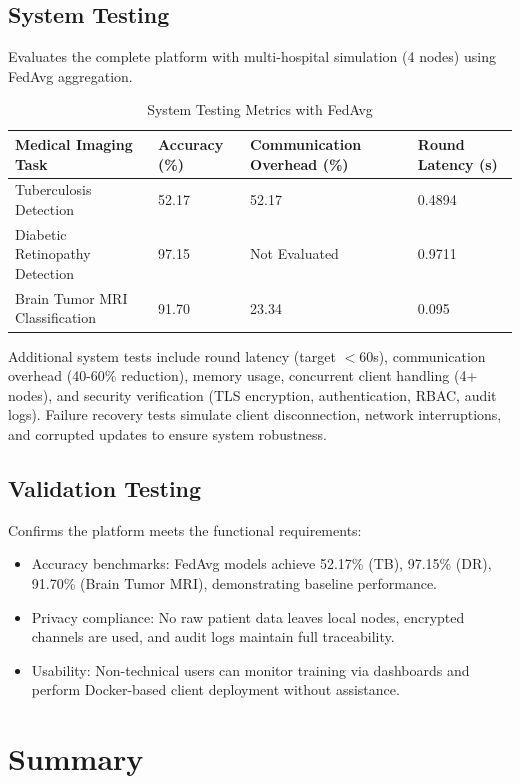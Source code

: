 \subsection{System Testing}
Evaluates the complete platform with multi-hospital simulation (4 nodes) using FedAvg aggregation.

\begin{table}[H]
\centering
\small
\caption{System Testing Metrics with FedAvg}
\begin{tabularx}{\textwidth}{|l|X|X|X|}
\hline
\textbf{Medical Imaging Task} & \textbf{Accuracy (\%)} & \textbf{Communication Overhead (\%)} & \textbf{Round Latency (s)} \\
\hline
Tuberculosis Detection & 52.17 & 52.17 & 0.4894 \\
Diabetic Retinopathy Detection & 97.15 & Not Evaluated & 0.9711 \\
Brain Tumor MRI Classification & 91.70 & 23.34 & 0.095 \\
\hline
\end{tabularx}
\end{table}


Additional system tests include round latency (target $<$60s), communication overhead (40-60\% reduction), memory usage, concurrent client handling (4+ nodes), and security verification (TLS encryption, authentication, RBAC, audit logs). Failure recovery tests simulate client disconnection, network interruptions, and corrupted updates to ensure system robustness.

\subsection{Validation Testing}
Confirms the platform meets the functional requirements:

\begin{itemize}
    \item Accuracy benchmarks: FedAvg models achieve 52.17\% (TB), 97.15\% (DR), 91.70\% (Brain Tumor MRI), demonstrating baseline performance.
    \item Privacy compliance: No raw patient data leaves local nodes, encrypted channels are used, and audit logs maintain full traceability.
    \item Usability: Non-technical users can monitor training via dashboards and perform Docker-based client deployment without assistance.
\end{itemize}



\section{Summary}

